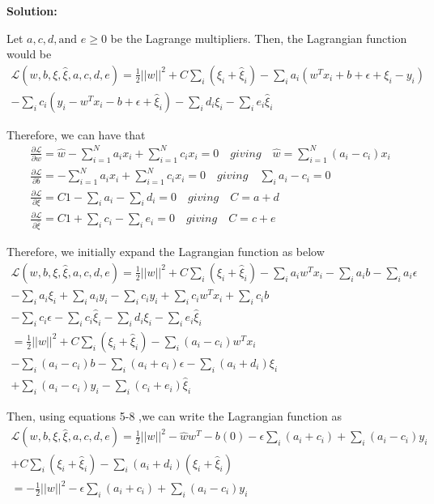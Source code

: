 \documentclass[12pt,a4paper]{article}
\begin{document}
	\noindent \textbf{Solution:}
	\vspace{0.2cm}
	
	\noindent Let $a, c, d, \text{and } e \geq 0$ be the Lagrange multipliers. Then, the Lagrangian function would be
	\begin{align*}
		\mathcal{L}(w, b, \xi, \hat{\xi}, a, c, d, e) = \frac{1}{2}||w||^2 + C\sum_{i}(\xi_i+\hat{\xi}_i)-\sum_{i}a_i(w^Tx_i+b+\epsilon+\xi_i-y_i)\\-\sum_{i}c_i(y_i-w^Tx_i-b+\epsilon+\hat{\xi}_i)-\sum_{i}d_i\xi_i-\sum_{i}e_i\hat{\xi}_i \quad \quad
	\end{align*}
	
	\noindent Therefore, we can have that
	\begin{align}
		\frac{\partial \mathcal{L}}{\partial w} =\hat{w} -\sum_{i=1}^{N}a_ix_i + \sum_{i=1}^{N}c_ix_i=0 \quad giving \quad \hat{w}=\sum_{i=1}^{N}(a_i-c_i)x_i\\
		\frac{\partial \mathcal{L}}{\partial b} =-\sum_{i=1}^{N}a_ix_i+\sum_{i=1}^{N}c_ix_i = 0 \quad giving \quad \sum_{i}a_i-c_i= 0\quad\\
		\frac{\partial \mathcal{L}}{\partial \xi} = C1-\sum_{i}a_i-\sum_{i}d_i= 0\quad giving 
		\quad C = a+d\qquad \\
		\frac{\partial \mathcal{L}}{\partial \hat{\xi}} =C1+\sum_{i}c_i-\sum_{i}e_i= 0\quad giving 
		\quad C = c+e \qquad
	\end{align}
	
	\noindent Therefore, we initially expand the Lagrangian function as below
	\begin{align*}
	\mathcal{L}(w, b, \xi, \hat{\xi}, a, c, d, e) = 
	\frac{1}{2}||w||^2
	+ C\sum_{i}(\xi_i+\hat{\xi}_i)
	-\sum_{i}a_iw^Tx_i
	-\sum_{i}a_ib
	-\sum_{i}a_i\epsilon \\
	-\sum_{i}a_i\xi_i
	+\sum_{i}a_iy_i
	-\sum_{i}c_iy_i
	+\sum_{i}c_iw^Tx_i
	+\sum_{i}c_ib \qquad\\
	-\sum_{i}c_i\epsilon
	-\sum_{i}c_i\hat{\xi}_i
	-\sum_{i}d_i\xi_i-\sum_{i}e_i\hat{\xi}_i \qquad\qquad\qquad\qquad \\
	 = 
	\frac{1}{2}||w||^2
	+ C\sum_{i}(\xi_i+\hat{\xi}_i)
	-\sum_{i}(a_i-c_i)w^Tx_i\qquad\qquad \quad\\
	-\sum_{i}(a_i-c_i)b
	-\sum_{i}(a_i+c_i)\epsilon
	-\sum_{i}(a_i+d_i)\xi_i\qquad\qquad\\
	+\sum_{i}(a_i-c_i)y_i
	-\sum_{i}(c_i+e_i)\hat{\xi}_i\qquad\qquad \qquad\qquad\qquad
	\end{align*}
	
	\noindent Then, using equations 5-8 ,we can write the Lagrangian function as 
	\begin{align*}
	\mathcal{L}(w, b, \xi, \hat{\xi}, a, c, d, e) = 
	\frac{1}{2}||w||^2-\hat{w}w^T-b(0)-\epsilon\sum_{i}(a_i+c_i)+\sum_{i}(a_i-c_i)y_i\\
	+ C\sum_{i}(\xi_i+\hat{\xi}_i)
	-\sum_{i}(a_i+d_i)(\xi_i+\hat{\xi}_i)\qquad\qquad\qquad \quad\\ =-\frac{1}{2}||w||^2-\epsilon\sum_{i}(a_i+c_i)+\sum_{i}(a_i-c_i)y_i\qquad\qquad \quad
	\end{align*}
\end{document}
